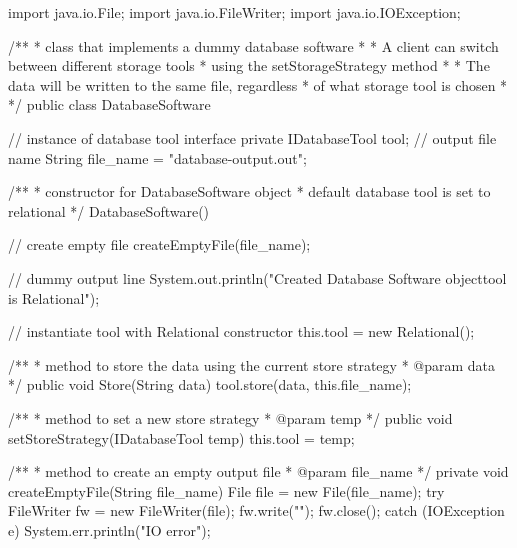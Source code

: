 \documentclass{article}
\begin{document}
\begin{spverbatim}
	import java.io.File;
	import java.io.FileWriter;
	import java.io.IOException;
	
	/**
	* class that implements a dummy database software
	* 
	* A client can switch between different storage tools
	* using the setStorageStrategy method
	* 
	* The data will be written to the same file, regardless
	* of what storage tool is chosen
	* 
	*/
	public class DatabaseSoftware {
		
	    // instance of database tool interface
	    private IDatabaseTool tool;
	    // output file name
	    String file_name = "database-output.out";
		
	    /**
	    * constructor for DatabaseSoftware object
	    * default database tool is set to relational
	    */
	    DatabaseSoftware(){ 
	        // create empty file
	        createEmptyFile(file_name);
			
	        // dummy output line
	        System.out.println("Created Database Software object\nDefault tool is Relational");
			
	        // instantiate tool with Relational constructor
	        this.tool = new Relational();
	    }
		
	    /**
	    * method to store the data using the current store strategy
	    * @param data 
	    */
	    public void Store(String data){ tool.store(data, this.file_name); }
		
	    /**
	    * method to set a new store strategy
	    * @param temp 
	    */
	    public void setStoreStrategy(IDatabaseTool temp){ this.tool = temp; }
		
	    /**
	    * method to create an empty output file
	    * @param file_name 
	    */
	    private void createEmptyFile(String file_name){
	        File file = new File(file_name);
	        try{
	            FileWriter fw = new FileWriter(file);
	            fw.write("");
	            fw.close();
	        }
	        catch (IOException e){ System.err.println("IO error"); }
	    }
		
	}
\end{spverbatim}

\newpage
\end{document}
